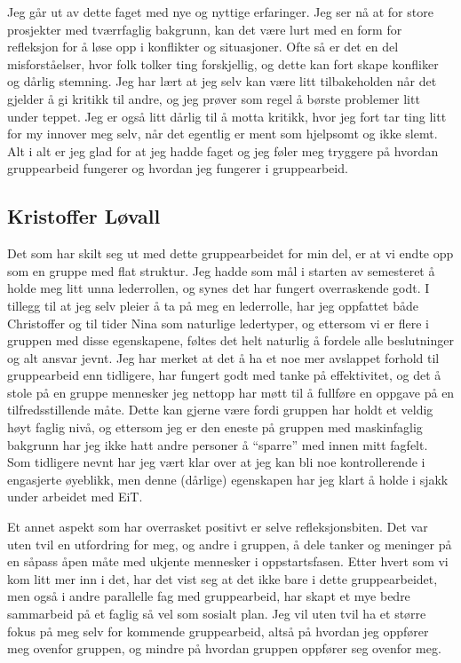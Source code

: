 Jeg går ut av dette faget med nye og nyttige erfaringer. Jeg ser nå at for store prosjekter med tværrfaglig bakgrunn, kan det være lurt med en form for refleksjon for å løse opp i konflikter og situasjoner. 
Ofte så er det en del misforståelser, hvor folk tolker ting forskjellig, og dette kan fort skape konfliker og dårlig stemning.
Jeg har lært at jeg selv kan være litt tilbakeholden når det gjelder å gi kritikk til andre, og jeg prøver som regel å børste problemer litt under teppet.
Jeg er også litt dårlig til å motta kritikk, hvor jeg fort tar ting litt for my innover meg selv, når det egentlig er ment som hjelpsomt og ikke slemt.
Alt i alt er jeg glad for at jeg hadde faget og jeg føler meg tryggere på hvordan gruppearbeid fungerer og hvordan jeg fungerer i gruppearbeid.

\subsection*{Kristoffer Løvall}
Det som har skilt seg ut med dette gruppearbeidet for min del, er at vi endte opp som en gruppe med flat struktur. Jeg hadde som mål i starten av 
semesteret å holde meg litt unna lederrollen, og synes det har fungert overraskende godt. I tillegg til at jeg selv pleier å ta på meg en lederrolle, har 
jeg oppfattet både Christoffer og til tider Nina som naturlige ledertyper, og ettersom vi er flere i gruppen med disse egenskapene, føltes det helt 
naturlig å fordele alle beslutninger og alt ansvar jevnt. Jeg har merket at det å ha et noe mer avslappet forhold til gruppearbeid enn tidligere, har 
fungert godt med tanke på effektivitet, og det å stole på en gruppe mennesker jeg nettopp har møtt til å fullføre en oppgave på en 
tilfredsstillende måte. Dette kan gjerne være fordi gruppen har holdt et veldig høyt faglig nivå, og ettersom jeg er den eneste på gruppen med 
maskinfaglig bakgrunn har jeg ikke hatt andre personer å ``sparre'' med innen mitt fagfelt. Som tidligere nevnt har jeg vært klar over at jeg kan bli 
noe kontrollerende i engasjerte øyeblikk, men denne (dårlige) egenskapen har jeg klart å holde i sjakk under arbeidet med EiT. 

Et annet aspekt som 
har overrasket positivt er selve refleksjonsbiten. Det var uten tvil en utfordring for meg, og andre i gruppen, å dele tanker og meninger på en 
såpass åpen måte med ukjente mennesker i oppstartsfasen. Etter hvert som vi kom litt mer inn i det, har det vist seg at det ikke bare i dette 
gruppearbeidet, men også i andre parallelle fag med gruppearbeid, har skapt et mye bedre sammarbeid på et faglig så vel som sosialt plan. Jeg vil 
uten tvil ha et større fokus på meg selv for kommende gruppearbeid, altså på hvordan jeg oppfører meg ovenfor gruppen, og mindre på hvordan 
gruppen oppfører seg ovenfor meg.

